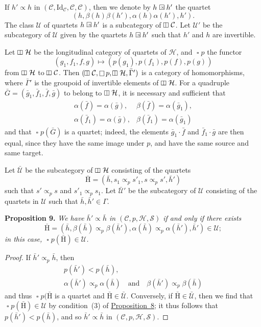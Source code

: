 \documentclass[a4paper,oneside,nobib,nofonts,notitlepage,notoc,nols,fleqn,justified]{tufte-book}
\newenvironment{itenv}[1]
  {\phantomsection\par\medskip\noindent\textbf{#1.}\itshape}
  {\par\medskip}
\newcommand{\oldpage}[1]{{\reversemarginpar\marginnote{\raggedleft\footnotesize\textit{p.~#1}}}}
\newcommand{\CC}{\mathcal{C}}
\newcommand{\HH}{\mathcal{H}}
\newcommand{\rHH}{\mathrm{H}}
\renewcommand{\SS}{\mathcal{S}}
\newcommand{\UU}{\mathcal{U}}
\newcommand{\subs}{\mathrel{\propto}}
\newcommand{\Id}{\mathrm{Id}}
\DeclareMathOperator{\sq}{\square}
\DeclareMathOperator{\vsq}{\raisebox{-.1em}{\rotatebox{90}{$\boxminus$}\,}}
\newcommand{\sqsubs}{\mathrel{\mathrlap{\square}\raisebox{.17em}{\scaleobj{0.65}{\,\,\propto}}}}
\begin{document}
If $h'\subs h$ in $(\CC,\Id_\CC,\CC,\CC)$, then we denote by $h\sqsubs h'$ the quartet
\[
  (h,\beta(h)\beta(h'),\alpha(h)\alpha(h'),h').
\]
The class $\UU$ of quartets $h\sqsubs h'$ is a subcategory of $\vsq\CC$.
Let $\UU'$ be the subcategory of $\UU$ given by the quartets $h\sqsubs h'$ such that $h'$ and $h$ are invertible.

Let $\vsq\HH$ be the longitudinal category of quartets of $\HH$, and $\sq p$ the functor
\[
  (g_1,f_1,f,g)
  \longmapsto (p(g_1),p(f_1),p(f),p(g))
\]
from $\vsq\HH$ to $\vsq\CC$.
Then $(\vsq\CC,\sq p,\vsq\HH,\bar{\Gamma}')$ is a category of homomorphisms, where $\bar{\Gamma}'$ is the groupoid of invertible elements of $\vsq\HH$.
For a quadruple $\bar{G}=(\bar{g}_1,\bar{f}_1,\bar{f},\bar{g})$ to belong to $\vsq\HH$, it is necessary and sufficient that
\[
  \begin{array}{ll}
    \alpha(\bar{f})=\alpha(\bar{g}),
    & \beta(\bar{f})=\alpha(\bar{g}_1),
  \\\alpha(\bar{f}_1)=\alpha(\bar{g}),
    & \beta(\bar{f}_1)=\alpha(\bar{g}_1)
  \end{array}
\]
and that $\sq p(\bar{G})$ is a quartet;
indeed, the elements $\bar{g}_1\cdot\bar{f}$ and $\bar{f}_1\cdot\bar{g}$ are then equal, since they have the same image under $p$, and have the same source and same target.

\oldpage{366}
Let $\bar{\UU}$ be the subcategory of $\vsq\HH$ consisting of the quartets
\[
  \bar{\rHH}
  = (\bar{h}, s_1\subs_p s'_1, s\subs_p s', \bar{h}')
\]
such that $s'\subs_p s$ and $s'_1\subs_p s_1$.
Let $\bar{\UU}'$ be the subcategory of $\UU$ consisting of the quartets in $\UU$ such that $\bar{h},\bar{h}'\in\Gamma$.

\begin{itenv}{Proposition 9}
\label{proposition:i-9}
  We have $\bar{h}'\subs\bar{h}$ in $(\CC,p,\HH,\SS)$ if and only if there exists
  \[
    \bar{\rHH}
    = \left(
      \bar{h},
      \beta(\bar{h})\subs_p\beta(\bar{h}'),
      \alpha(\bar{h})\subs_p\alpha(\bar{h}'),
      \bar{h}'
    \right) \in \UU;
  \]
  in this case, $\sq p(\bar{\rHH})\in\UU$.
\end{itenv}

\begin{proof}
  If $\bar{h}'\subs_p\bar{h}$, then
  \[
    \begin{gathered}
      p(\bar{h}')<p(\bar{h}),
    \\\alpha(\bar{h}')\subs_p\alpha(\bar{h})
      \quad\text{and}\quad
      \beta(\bar{h}')\subs_p\beta(\bar{h})
    \end{gathered}
  \]
  and thus $\sq p(\bar{\rHH}$ is a quartet and $\bar{\rHH}\in\bar{\UU}$.
  Conversely, if $\bar{\rHH}\in\bar{\UU}$, then we find that $\sq p(\bar{\rHH})\in\UU$ by condition~(3) of \hyperref[proposition:i-8]{Proposition~8};
  it thus follows that $p(\bar{h}')<p(\bar{h})$, and so $\bar{h}'\subs\bar{h}$ in $(\CC,p,\HH,\SS)$.
\end{proof}
\end{document}
